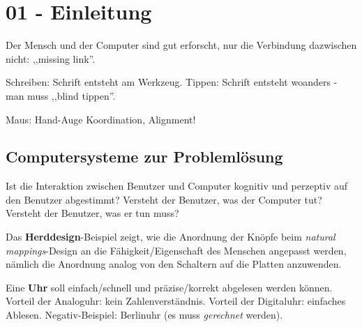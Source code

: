 \section{01 - Einleitung}

Der Mensch und der Computer sind gut erforscht, nur die Verbindung dazwischen nicht: ,,missing link''.

Schreiben: Schrift entsteht am Werkzeug. Tippen: Schrift entsteht woanders - man muss ,,blind tippen''.

Maus: Hand-Auge Koordination, Alignment!

\subsection{Computersysteme zur Problemlösung}

Ist die Interaktion zwischen Benutzer und Computer kognitiv und perzeptiv auf den
Benutzer abgestimmt? Versteht der Benutzer, was der Computer tut? Versteht der
Benutzer, was er tun muss?

Das \textbf{Herddesign}-Beispiel zeigt, wie die Anordnung der Knöpfe beim \emph{natural mappings}-Design
an die Fähigkeit/Eigenschaft des Menschen angepasst werden, nämlich die Anordnung
analog von den Schaltern auf die Platten anzuwenden.

Eine \textbf{Uhr} soll einfach/schnell und präzise/korrekt abgelesen werden können.
Vorteil der Analoguhr: kein Zahlenverständnis. Vorteil der Digitaluhr: einfaches
Ablesen. Negativ-Beispiel: Berlinuhr (es muss \emph{gerechnet} werden).
